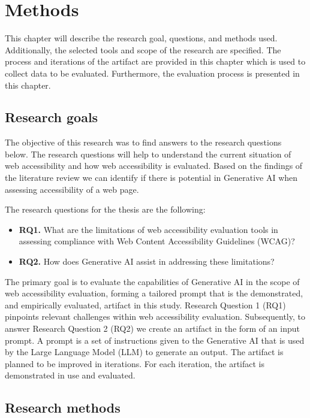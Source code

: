 \chapter{Methods\label{methods}}

This chapter will describe the research goal, questions, and methods used. Additionally, the selected tools and scope of the research are specified. The process and iterations of the artifact are provided in this chapter which is used to collect data to be evaluated. Furthermore, the evaluation process is presented in this chapter.

\section{Research goals}

The objective of this research was to find answers to the research questions below. The research questions will help to understand the current situation of web accessibility and how web accessibility is evaluated. Based on the findings of the literature review we can identify if there is potential in Generative AI when assessing accessibility of a web page. 

The research questions for the thesis are the following:

\begin{itemize}
    \item \textbf{RQ1.} What are the limitations of web accessibility evaluation tools in assessing compliance with Web Content Accessibility Guidelines (WCAG)?
    \item \textbf{RQ2.} How does Generative AI assist in addressing these limitations?
\end{itemize}

The primary goal is to evaluate the capabilities of Generative AI in the scope of web accessibility evaluation, forming a tailored prompt that is the demonstrated, and empirically evaluated, artifact in this study. Research Question 1 (RQ1) pinpoints relevant challenges within web accessibility evaluation. Subsequently, to answer Research Question 2 (RQ2) we create an artifact in the form of an input prompt. A prompt is a set of instructions given to the Generative AI that is used by the Large Language Model (LLM) to generate an output. The artifact is planned to be improved in iterations. For each iteration, the artifact is demonstrated in use and evaluated.

\section{Research methods}

